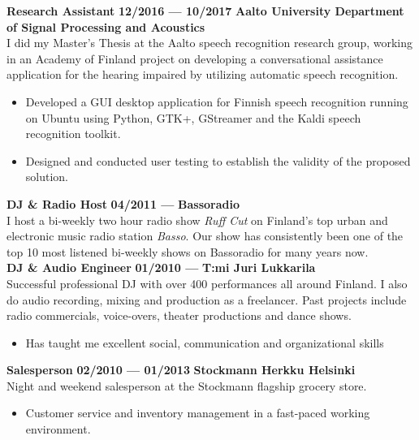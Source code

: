 \documentclass[8pt,a4paper,oneside]{article}
\newcommand{\myrule}{\vspace{0.5mm} {\color{lightgray}{\hrule height 0.5pt width \textwidth depth 0pt}} \vspace{1mm}}
\newcommand{\workplace}[1]{{\bfseries \fontsize{10.5}{10.5}\selectfont #1}}
\newcommand{\sectitle}[1]{{\sc \bfseries \LARGE #1}}
\newcommand{\boxarc}{2.5mm}
\newcommand{\boxtop}{1.5mm}
\begin{document}
\begin{minipage}[t]{0.64\textwidth}
\begin{tcolorbox}[top=1mm,bottom=1mm,right=1mm,left=1mm,arc=\boxarc,toptitle=\boxtop,bottomtitle=1mm,title=\sectitle{Experience},box align=bottom]
	{\bfseries \color{textcolor} \large Research Assistant} \hfill \textbf{12/2016 --- 10/2017} \myrule
	\workplace{Aalto University Department of Signal Processing and Acoustics} \\
	I did my Master’s Thesis at the Aalto speech recognition research group, working in an Academy of Finland project on developing a conversational assistance application for the hearing impaired by utilizing automatic speech recognition.
	\begin{itemize}[leftmargin=0.4cm, itemsep=0.5mm,parsep=0pt,topsep=0.5mm,label={\large\textbullet}]
		\small
		\item Developed a GUI desktop application for Finnish speech recognition running on Ubuntu using Python, GTK+, GStreamer and the Kaldi speech recognition toolkit.
		\item Designed and conducted user testing to establish the validity of the proposed solution. \\
	\end{itemize}
	
	{\bfseries \color{textcolor} \large DJ \& Radio Host } \hfill \textbf{04/2011 --- } \myrule
	\workplace{Bassoradio} \\
	I host a bi-weekly two hour radio show \textit{Ruff Cut} on Finland’s top urban and electronic music radio station \textit{Basso}. Our show has consistently been one of the top 10 most listened bi-weekly shows on Bassoradio for many years now. \\
	
	{\bfseries \color{textcolor} \large DJ \& Audio Engineer } \hfill \textbf{01/2010 --- } \myrule
	\workplace{T:mi Juri Lukkarila} \\
	Successful professional DJ with over 400 performances all around Finland. I also do audio recording, mixing and production as a freelancer. Past projects include radio commercials, voice-overs, theater productions and dance shows.
	\begin{itemize}[leftmargin=0.4cm, itemsep=0.5mm,parsep=0pt,topsep=0.5mm,label={\large\textbullet}]
		\small
		\item Has taught me excellent social, communication and organizational skills \\
	\end{itemize}
	
	{\bfseries \color{textcolor} \large Salesperson } \hfill \textbf{02/2010 --- 01/2013} \myrule
	\workplace{Stockmann Herkku Helsinki} \\
	Night and weekend salesperson at the Stockmann flagship grocery store.
	\begin{itemize}[leftmargin=0.4cm, itemsep=0.5mm,parsep=0pt,topsep=0.5mm,label={\large\textbullet}]
		\small
		\item Customer service and inventory management in a fast-paced working environment.
	\end{itemize}
	\end{tcolorbox}
	
\end{minipage}%
\end{document}
